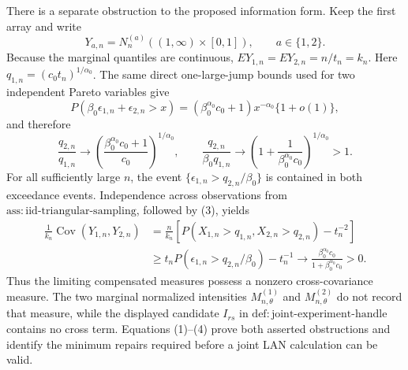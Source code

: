 There is a separate obstruction to the proposed information form.  Keep the first array and write
\[
 Y_{a,n}=N_n^{(a)}((1,\infty)\times[0,1]),\qquad a\in\{1,2\}.
\]
Because the marginal quantiles are continuous, \(EY_{1,n}=EY_{2,n}=n/t_n=k_n\).  Here \(q_{1,n}=(c_0t_n)^{1/\alpha_0}\).  The same direct one-large-jump bounds used for two independent Pareto variables give
\[
 P(\beta_0\epsilon_{1,n}+\epsilon_{2,n}>x)
 =(\beta_0^{\alpha_0}c_0+1)x^{-\alpha_0}\{1+o(1)\},
\]
and therefore
\[
 \frac{q_{2,n}}{q_{1,n}}
 \longrightarrow\left(\frac{\beta_0^{\alpha_0}c_0+1}{c_0}\right)^{1/\alpha_0},
 \qquad
 \frac{q_{2,n}}{\beta_0q_{1,n}}
 \longrightarrow\left(1+\frac1{\beta_0^{\alpha_0}c_0}\right)^{1/\alpha_0}>1. \tag{3}
\]
For all sufficiently large \(n\), the event \(\{\epsilon_{1,n}>q_{2,n}/\beta_0\}\) is contained in both exceedance events.  Independence across observations from \(\mathrm{ass{:}iid\text{-}triangular\text{-}sampling}\), followed by (3), yields
\[
\begin{split}
 \frac1{k_n}\operatorname{Cov}(Y_{1,n},Y_{2,n})
 &=\frac n{k_n}\left[P(X_{1,n}>q_{1,n},X_{2,n}>q_{2,n})-t_n^{-2}\right]\\
 &\geq t_nP(\epsilon_{1,n}>q_{2,n}/\beta_0)-t_n^{-1}
 \longrightarrow\frac{\beta_0^{\alpha_0}c_0}{1+\beta_0^{\alpha_0}c_0}>0.
\end{split}\tag{4}
\]
Thus the limiting compensated measures possess a nonzero cross-covariance measure.  The two marginal normalized intensities \(M_{n,\theta}^{(1)}\) and \(M_{n,\theta}^{(2)}\) do not record that measure, while the displayed candidate \(I_{rs}\) in \(\mathrm{def{:}joint\text{-}experiment\text{-}handle}\) contains no cross term.  Equations (1)--(4) prove both asserted obstructions and identify the minimum repairs required before a joint LAN calculation can be valid.